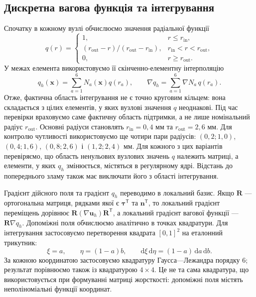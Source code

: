 \subsection{Дискретна вагова функція та інтегрування}

Спочатку в кожному вузлі обчислюємо значення радіальної функції
\begin{equation}
 q(r)=
 \begin{cases}
 1,&r\le r_{\mathrm{in}},\\
 (r_{\mathrm{out}}-r)/(r_{\mathrm{out}}-r_{\mathrm{in}}),
       &r_{\mathrm{in}}<r<r_{\mathrm{out}},\\
 0,&r\ge r_{\mathrm{out}}.
 \end{cases}
 \label{eq:method-q}
\end{equation}
У межах елемента використовуємо її скінченно-елементну інтерполяцію
\begin{equation}
 q_h(\boldsymbol x)=\sum_{a=1}^{6}N_a(\boldsymbol x)q(r_a),
 \qquad
 \nabla q_h=\sum_{a=1}^{6}\nabla N_a\,q(r_a).
 \label{eq:method-qh}
\end{equation}
Отже, фактична область інтегрування не є точно круговим кільцем: вона складається з цілих елементів, у яких вузлові значення $q$ неоднакові. Під час перевірки враховуємо саме фактичну область підтримки, а не лише номінальний радіус $r_{\mathrm{out}}$. Основні радіуси становлять $r_{\mathrm{in}}=0{,}4$ мм та $r_{\mathrm{out}}=2{,}6$ мм. Для контролю чутливості використовуємо ще чотири пари радіусів: $(0{,}2;1{,}0)$, $(0{,}4;1{,}6)$, $(0{,}8;2{,}6)$ і $(1{,}2;2{,}4)$ мм. Для кожного з цих варіантів перевіряємо, що область ненульових вузлових значень $q$ належить матриці, а елементи, у яких $q_h$ змінюється, містяться в регулярному ядрі. Відстань до попереднього зламу також має виключати його з області інтегрування.

Градієнт дійсного поля та градієнт $q_h$ переводимо в локальний базис. Якщо $\boldsymbol R$ --- ортогональна матриця, рядками якої є $\boldsymbol\tau^{\mathsf T}$ та $\boldsymbol n^{\mathsf T}$, то локальний градієнт переміщень дорівнює $\boldsymbol R(\nabla\boldsymbol u_h)\boldsymbol R^{\mathsf T}$, а локальний градієнт вагової функції --- $\boldsymbol R\nabla q_h$. Допоміжні поля обчислюємо аналітично в точках квадратури. Для інтегрування застосовуємо перетворення квадрата $[0,1]^2$ на еталонний трикутник:
\begin{equation}
 \xi=a,\qquad \eta=(1-a)b,\qquad
 \mathrm d\xi\,\mathrm d\eta=(1-a)\,\mathrm da\,\mathrm db.
 \label{eq:method-duffy}
\end{equation}
За кожною координатою застосовуємо квадратуру Гаусса---Лежандра порядку 6; результат порівнюємо також із квадратурою $4\times4$. Це не та сама квадратура, що використовується при формуванні матриці жорсткості: допоміжні поля містять неполіноміальні функції координат.


